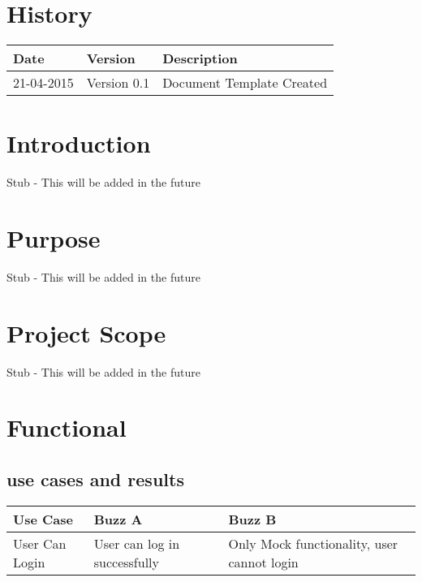 \documentclass[12pt]{article}
\begin{document}


\section{History}
\begin{tabular}{|l|l|l|}

\hline
Date & Version & Description\\ %
\hline
21-04-2015 & Version 0.1 & Document Template Created\\ %



\end{tabular}

\newpage
\tableofcontents
\newpage

\section{Introduction} %
Stub - This will be added in the future

\section{Purpose} %
Stub - This will be added in the future


\section{Project Scope} %
Stub - This will be added in the future

\section{Functional} %
\subsection{use cases and results}
\begin{tabular}{|l|l|l|}

\hline
Use Case & Buzz A & Buzz B \\ %
\hline
User Can Login & User can log in successfully & Only Mock functionality, user cannot login\\ %




\end{tabular}
\end{document}
